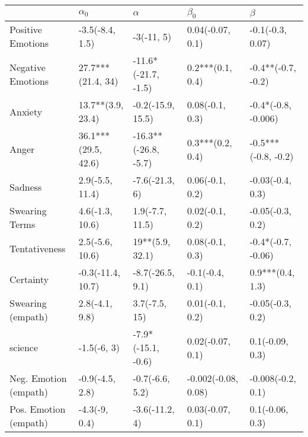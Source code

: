 \begin{tabular}{lllll}
\toprule
{} &           $\alpha_0$ &              $\alpha$ &            $\beta_0$ &              $\beta$ \\
\midrule
Positive Emotions     &      -3.5(-8.4, 1.5) &            -3(-11, 5) &     0.04(-0.07, 0.1) &     -0.1(-0.3, 0.07) \\
Negative Emotions     &    27.7***(21.4, 34) &   -11.6*(-21.7, -1.5) &     0.2***(0.1, 0.4) &   -0.4**(-0.7, -0.2) \\
Anxiety               &    13.7**(3.9, 23.4) &     -0.2(-15.9, 15.5) &      0.08(-0.1, 0.3) &  -0.4*(-0.8, -0.006) \\
Anger                 &  36.1***(29.5, 42.6) &  -16.3**(-26.8, -5.7) &     0.3***(0.2, 0.4) &  -0.5***(-0.8, -0.2) \\
Sadness               &      2.9(-5.5, 11.4) &        -7.6(-21.3, 6) &      0.06(-0.1, 0.2) &     -0.03(-0.4, 0.3) \\
Swearing Terms        &      4.6(-1.3, 10.6) &       1.9(-7.7, 11.5) &      0.02(-0.1, 0.2) &     -0.05(-0.3, 0.2) \\
Tentativeness         &      2.5(-5.6, 10.6) &       19**(5.9, 32.1) &      0.08(-0.1, 0.3) &   -0.4*(-0.7, -0.06) \\
Certainty             &    -0.3(-11.4, 10.7) &      -8.7(-26.5, 9.1) &      -0.1(-0.4, 0.1) &     0.9***(0.4, 1.3) \\
Swearing (empath)     &       2.8(-4.1, 9.8) &         3.7(-7.5, 15) &      0.01(-0.1, 0.2) &     -0.05(-0.3, 0.2) \\
science               &          -1.5(-6, 3) &    -7.9*(-15.1, -0.6) &     0.02(-0.07, 0.1) &      0.1(-0.09, 0.3) \\
Neg. Emotion (empath) &      -0.9(-4.5, 2.8) &       -0.7(-6.6, 5.2) &  -0.002(-0.08, 0.08) &    -0.008(-0.2, 0.1) \\
Pos. Emotion (empath) &        -4.3(-9, 0.4) &        -3.6(-11.2, 4) &     0.03(-0.07, 0.1) &      0.1(-0.06, 0.3) \\
\bottomrule
\end{tabular}
